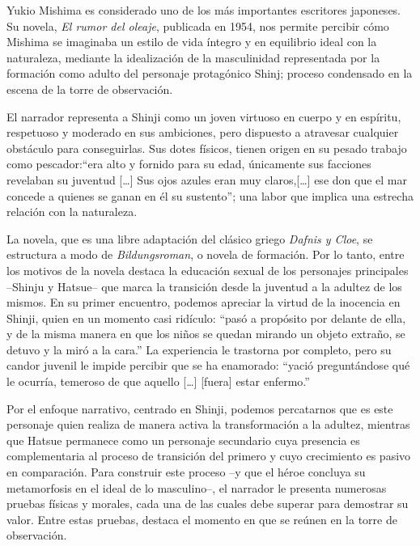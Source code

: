 Yukio Mishima es considerado uno de los más importantes escritores japoneses.
Su novela, \emph{El rumor del oleaje}, publicada en 1954, nos permite percibir cómo Mishima se imaginaba un estilo de vida íntegro y en equilibrio ideal con la naturaleza, mediante la idealización de la masculinidad representada por la formación como adulto del personaje protagónico Shinj; proceso condensado en la escena de la torre de observación.

El narrador representa a Shinji como un joven virtuoso en cuerpo y en espíritu, respetuoso y moderado en sus ambiciones, pero dispuesto a atravesar cualquier obstáculo para conseguirlas. Sus dotes físicos, tienen origen en su pesado trabajo como pescador:``era alto y fornido para su edad, únicamente sus facciones revelaban su juventud [\ldots] Sus ojos azules eran muy claros,[\ldots] ese don que el mar concede a quienes se ganan en él su sustento''\autocite{mishima2006}; una labor que implica una estrecha relación con la naturaleza.

La novela, que es una libre adaptación del clásico griego \emph{Dafnis y Cloe}, se estructura a modo de \emph{Bildungsroman}, o novela de formación.
Por lo tanto, entre los motivos de la novela destaca la educación sexual de los personajes principales --Shinju y Hatsue-- que marca la transición desde la juventud a la adultez de los mismos.
En su primer encuentro, podemos apreciar la virtud de la inocencia en Shinji, quien en un momento casi ridículo: ``pasó a propósito por delante de ella, y de la misma manera en que los niños se quedan mirando un objeto extraño, se detuvo y la miró a la cara.''\autocite{mishima2006}
La experiencia le trastorna por completo, pero su candor juvenil le impide percibir que se ha enamorado: ``yació preguntándose qué le ocurría, temeroso de que aquello [\ldots] [fuera] estar enfermo.''\autocite{mishima2006}

Por el enfoque narrativo, centrado en Shinji, podemos percatarnos que es este personaje quien realiza de manera activa la transformación a la adultez, mientras que Hatsue permanece como un personaje secundario cuya presencia es complementaria al proceso de transición del primero y cuyo crecimiento es pasivo en comparación.
Para construir este proceso --y que el héroe concluya su metamorfosis en el ideal de lo masculino--, el narrador le presenta numerosas pruebas físicas y morales, cada una de las cuales debe superar para demostrar su valor. Entre estas pruebas, destaca el momento en que se reúnen en la torre de observación. 

